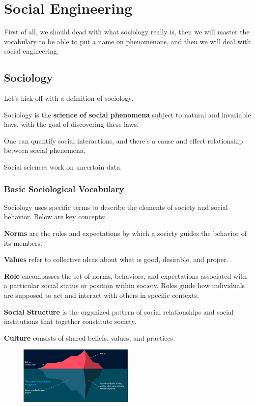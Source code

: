 \chapter{Social Engineering}
First of all, we should dead with what sociology really is, then we
will master the vocabulary to be able to put a name on phenomenons,
and then we will deal with social engineering.
\section{Sociology}
Let's kick off with a definition of sociology.

\begin{boxH}
  Sociology is the \textbf{science of social phenomena} subject to
  natural and invariable laws, with the goal of discovering these
  laws.
\end{boxH}
One can quantify social interactions, and there's a cause and effect 
relationship between social phenomena.

Social sciences work on uncertain data.

\subsection{Basic Sociological Vocabulary}

Sociology uses specific terms to describe the elements of society and
social behavior. Below are key concepts:

\textbf{Norms} are the rules and expectations by which a society
guides the behavior of its members.

\textbf{Values} refer to collective ideas about what is good,
desirable, and proper.

\textbf{Role} encompasses the set of norms, behaviors, and
expectations associated with a particular social status or position
within society. Roles guide how individuals are supposed to act and
interact with others in specific contexts.

\textbf{Social Structure} is the organized pattern of social
relationships and social institutions that together constitute
society.

\textbf{Culture} consists of shared beliefs, values, and practices.


\begin{figure}[H]
  \centering
  \includegraphics[width=0.5\textwidth]{img/sociology iceberg.png}
\end{figure}


